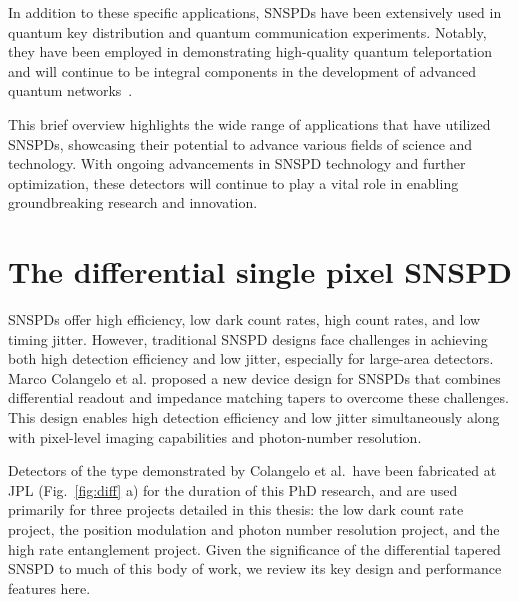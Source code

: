 \documentclass[11pt]{caltech_thesis} %
\begin{document}
In addition to these specific applications, SNSPDs have been extensively used in quantum key distribution and quantum communication experiments. Notably, they have been employed in demonstrating high-quality quantum teleportation~\autocite{Valivarthi2020} and will continue to be integral components in the development of advanced quantum networks~\autocite{Valivarthi2022}.

This brief overview highlights the wide range of applications that have utilized SNSPDs, showcasing their potential to advance various fields of science and technology. With ongoing advancements in SNSPD technology and further optimization, these detectors will continue to play a vital role in enabling groundbreaking research and innovation.

\hypertarget{the-differential-single-pixel-snspd}{%
\section{The differential single pixel SNSPD}\label{the-differential-single-pixel-snspd}}

SNSPDs offer high efficiency, low dark count rates, high count rates, and low timing jitter. However, traditional SNSPD designs face challenges in achieving both high detection efficiency and low jitter, especially for large-area detectors. Marco Colangelo et al. \autocite{Colangelo2023} proposed a new device design for SNSPDs that combines differential readout and impedance matching tapers to overcome these challenges. This design enables high detection efficiency and low jitter simultaneously along with pixel-level imaging capabilities and photon-number resolution.

Detectors of the type demonstrated by Colangelo et al.~have been fabricated at JPL (Fig.~\ref{fig:diff} a) for the duration of this PhD research, and are used primarily for three projects detailed in this thesis: the low dark count rate project, the position modulation and photon number resolution project, and the high rate entanglement project. Given the significance of the differential tapered SNSPD to much of this body of work, we review its key design and performance features here.
\end{document}

